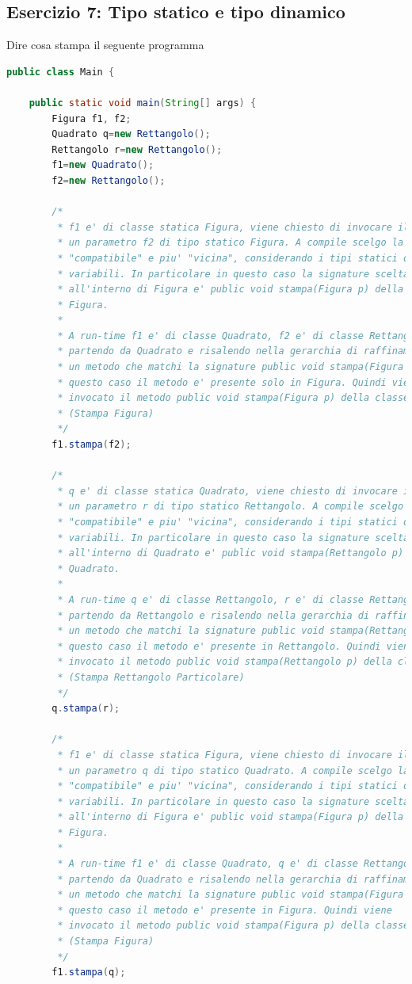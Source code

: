 \documentclass{article}
\begin{document}
\subsection{Esercizio 7: Tipo statico e tipo dinamico}
Dire cosa stampa il seguente programma 
\begin{lstlisting}[language=Java,escapechar=|]
public class Main {

	public static void main(String[] args) {
		Figura f1, f2;
		Quadrato q=new Rettangolo();
		Rettangolo r=new Rettangolo();
		f1=new Quadrato();
		f2=new Rettangolo();
		
		/*
		 * f1 e' di classe statica Figura, viene chiesto di invocare il metodo stampa su
		 * un parametro f2 di tipo statico Figura. A compile scelgo la signature
		 * "compatibile" e piu' "vicina", considerando i tipi statici delle
		 * variabili. In particolare in questo caso la signature scelta
		 * all'interno di Figura e' public void stampa(Figura p) della classe
		 * Figura.
		 * 
		 * A run-time f1 e' di classe Quadrato, f2 e' di classe Rettangolo. Per questo
		 * partendo da Quadrato e risalendo nella gerarchia di raffinamento cerco
		 * un metodo che matchi la signature public void stampa(Figura p). In
		 * questo caso il metodo e' presente solo in Figura. Quindi viene
		 * invocato il metodo public void stampa(Figura p) della classe Figura
		 * (Stampa Figura)
		 */
		f1.stampa(f2);
		
		/*
		 * q e' di classe statica Quadrato, viene chiesto di invocare il metodo stampa su
		 * un parametro r di tipo statico Rettangolo. A compile scelgo la signature
		 * "compatibile" e piu' "vicina", considerando i tipi statici delle
		 * variabili. In particolare in questo caso la signature scelta
		 * all'interno di Quadrato e' public void stampa(Rettangolo p) della classe
		 * Quadrato.
		 * 
		 * A run-time q e' di classe Rettangolo, r e' di classe Rettangolo. Per questo
		 * partendo da Rettangolo e risalendo nella gerarchia di raffinamento cerco
		 * un metodo che matchi la signature public void stampa(Rettangolo p). In
		 * questo caso il metodo e' presente in Rettangolo. Quindi viene
		 * invocato il metodo public void stampa(Rettangolo p) della classe Rettangolo
		 * (Stampa Rettangolo Particolare)
		 */
		q.stampa(r);
		
		/*
		 * f1 e' di classe statica Figura, viene chiesto di invocare il metodo stampa su
		 * un parametro q di tipo statico Quadrato. A compile scelgo la signature
		 * "compatibile" e piu' "vicina", considerando i tipi statici delle
		 * variabili. In particolare in questo caso la signature scelta
		 * all'interno di Figura e' public void stampa(Figura p) della classe
		 * Figura.
		 * 
		 * A run-time f1 e' di classe Quadrato, q e' di classe Rettangolo. Per questo
		 * partendo da Quadrato e risalendo nella gerarchia di raffinamento cerco
		 * un metodo che matchi la signature public void stampa(Figura p). In
		 * questo caso il metodo e' presente in Figura. Quindi viene
		 * invocato il metodo public void stampa(Figura p) della classe Figura
		 * (Stampa Figura)
		 */
		f1.stampa(q);
		

\end{lstlisting}
\end{document}
